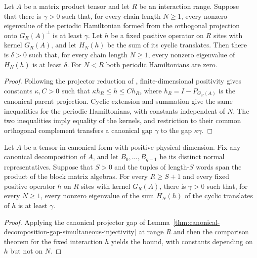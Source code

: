\begin{lemma}
    \label{thm:positive-parent-interaction-uniform-gap}
    \leanok
    Let $A$ be a matrix product tensor and let $R$ be an interaction range.
    Suppose that there is $\gamma>0$ such that, for every chain length
    $N\geq1$, every nonzero eigenvalue of the periodic Hamiltonian formed
    from the orthogonal projection onto $G_R(A)^\perp$ is at least $\gamma$.
    Let $h$ be a fixed positive
    operator on $R$ sites with kernel $G_R(A)$, and let $H_N(h)$ be the sum
    of its cyclic translates. Then there is $\delta>0$ such that, for every
    chain length $N\geq1$, every nonzero eigenvalue of $H_N(h)$ is at least
    $\delta$.
    For $N<R$ both periodic Hamiltonians are zero.
\end{lemma}
\begin{proof}
    \leanok
    Following the projector reduction of \cite[Section~IV.C]{Cirac2021Matrix},
    finite-dimensional positivity gives constants $\kappa,C>0$ such that
    $\kappa h_R\leq h\leq C h_R$, where $h_R=I-P_{G_R(A)}$ is the canonical
    parent projection.
    Cyclic extension and summation give the same inequalities for the periodic
    Hamiltonians, with constants independent of $N$. The two inequalities imply
    equality of the kernels, and restriction to their common orthogonal
    complement transfers a canonical gap $\gamma$ to the gap $\kappa\gamma$.
\end{proof}

\begin{lemma}
    \label{thm:canonical-decomposition-positive-parent-gap-simultaneous-injectivity}
    \leanok
    Let $A$ be a tensor in canonical form with positive physical dimension.
    Fix any canonical decomposition of $A$, and let $B_0,\ldots,B_{g-1}$ be
    its distinct normal representatives.
    Suppose that $S>0$ and the tuples of length-$S$ words span the product of
    the block matrix algebras. For every $R\geq S+1$ and
    every fixed positive operator $h$ on $R$ sites with kernel $G_R(A)$,
    there is $\gamma>0$ such that, for every $N\geq1$, every nonzero
    eigenvalue of the sum $H_N(h)$ of the cyclic translates of $h$ is at
    least $\gamma$.
\end{lemma}
\begin{proof}
    \leanok
    Applying the canonical projector gap of
    Lemma~\ref{thm:canonical-decomposition-gap-simultaneous-injectivity} at
    range $R$ and then the comparison theorem for the fixed interaction $h$
    yields the bound, with constants depending on $h$ but not on $N$.
\end{proof}

